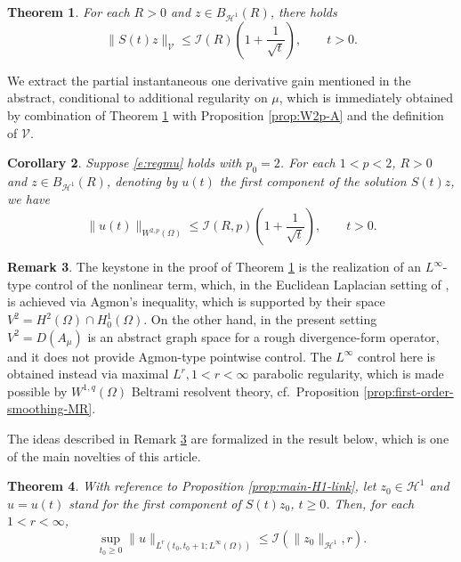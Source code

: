 \documentclass[12pt,leqno]{amsart}
\newtheorem{theorem}{Theorem}[section]
\newtheorem{corollary}[theorem]{Corollary}
\theoremstyle{definition}
\newtheorem{remark}[theorem]{Remark}
\numberwithin{equation}{section}
\numberwithin{figure}{section}
\begin{document}
 \begin{theorem} \label{thm-inst}
For  each $R>0$ and $z\in   B_{\mathcal H^1}(R)$, there holds
\[
\|S(t)z\|_{\mathcal V}\le \mathcal I(R)\left(1+\frac{1}{\sqrt{t}}\right), \qquad t>0.
\]

\end{theorem}
We extract the partial instantaneous one derivative gain mentioned in the abstract, conditional to additional regularity on $\mu$, which is immediately obtained by combination of Theorem  \ref{thm-inst} with Proposition \ref{prop:W2p-A} and the definition of $\mathcal V$.
 \begin{corollary} \label{cor-inst}Suppose \eqref{e:regmu} holds with $p_0=2$. For  each $1<p<2$, $R>0$ and $z\in   B_{\mathcal H^1}(R)$, denoting  by $u(t)$ the first component of the solution $S(t)z$, we have
\[
\|u(t)\|_{W^{2,p}(\Omega)}\le \mathcal I(R,p)\left(1+\frac{1}{\sqrt{t}}\right), \qquad t>0.
\]
 \end{corollary}
\begin{remark}
\label{rem:key}
The keystone in the proof of Theorem \ref{thm-inst}  is the realization of an $L^\infty$-type control of the nonlinear term, which, in the Euclidean Laplacian setting of \cite{CGDP2010}, is achieved via Agmon's inequality, which is supported by their space ${V^2}=H^2(\Omega) \cap H^{1}_0(\Omega)$. On the other hand, in the present setting ${V^2}=D(A_\mu)$ is an abstract graph space for a rough
divergence-form operator, and it does not provide Agmon-type pointwise control. The $L^\infty $ control here is obtained instead via maximal $L^r, 1<r<\infty$ parabolic regularity, which is made possible by $W^{1,q}(\Omega)$  Beltrami resolvent theory, cf.\ Proposition \ref{prop:first-order-smoothing-MR}.
\end{remark} 
The ideas described in Remark  \ref{rem:key} are formalized in the result below, which is one of the main novelties of this article.   \begin{theorem}
 \label{thm:main-Linfty-smoothing}
With reference to Proposition \ref{prop:main-H1-link}, let $z_0\in \mathcal H^1$
 and $u=u(t)$ stand for the first component of $S(t) z_0$, $t\geq 0$. Then, for each $1<r<\infty$,\[
\sup_{t_0\geq 0} 
\|u\|_{L^r(t_0,t_0+1;L^\infty(\Omega))}\le \mathcal I\left(\|z_0\|_{\mathcal H^{1}},r\right).
\]
\end{theorem}

 

\end{document}
